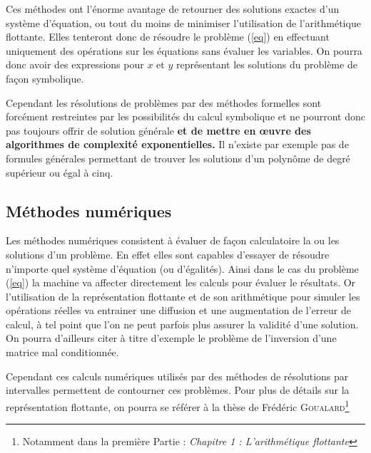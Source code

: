  Ces méthodes ont l'énorme avantage de retourner des solutions exactes d'un système d'équation, ou tout du moins de minimiser l'utilisation de l'arithmétique flottante. Elles tenteront donc de résoudre le problème (\ref{eq}) en effectuant uniquement des opérations sur les équations sans évaluer les variables. On pourra donc avoir des expressions pour $x$ et $y$ représentant les solutions du problème de façon symbolique. 

Cependant les résolutions de problèmes par des méthodes formelles sont forcément restreintes par les possibilités du calcul symbolique et ne pourront donc pas toujours offrir de solution générale \textbf{et de mettre en œuvre des algorithmes de complexité exponentielles.} Il n'existe par exemple pas de formules générales permettant de trouver les solutions d'un polynôme de degré supérieur ou égal à cinq.


\subsection{Méthodes numériques}
Les méthodes numériques consistent à évaluer de façon calculatoire la ou les solutions d'un problème. En effet elles sont capables d'essayer de résoudre n'importe quel système d'équation (ou d'égalités). Ainsi dans le cas du problème (\ref{eq}) la machine va affecter directement les calculs pour évaluer le résultats. Or l'utilisation de la représentation flottante et de son arithmétique pour simuler les opérations réelles va entrainer une diffusion et une augmentation de l'erreur de calcul, à tel point que l'on ne peut  parfois plus assurer la validité d'une solution. On pourra d'ailleurs citer à titre d'exemple le problème de l'inversion d'une matrice mal conditionnée\cite{Conditionnement}. 

Cependant ces calculs numériques utilisés  par des méthodes de résolutions par intervalles permettent de contourner ces problèmes. Pour plus de détails sur la représentation flottante, on pourra se référer à la thèse de Frédéric \textsc{Goualard}\footnote{Notamment dans la première Partie : \emph{Chapitre 1 : L’arithmétique flottante}} \cite{Goualard}


